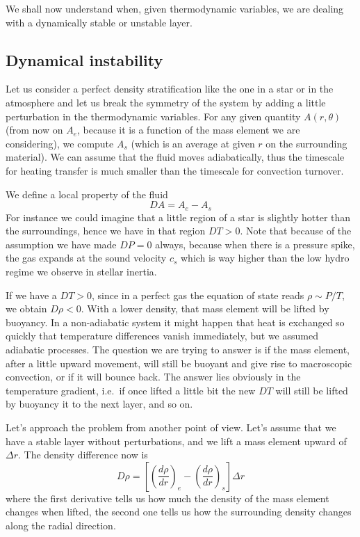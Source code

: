 We shall now understand when, given thermodynamic variables, we are dealing with a dynamically stable or unstable layer.


\subsection{Dynamical instability}
Let us consider a perfect density stratification like the one in a star or in the atmosphere and let us break the symmetry of the system by adding a little perturbation in the thermodynamic variables. For any given quantity $A(r, \theta)$ (from now on $A_e$, because it is a function of the mass element we are considering), we compute $A_s$ (which is an average at given $r$ on the surrounding material). We can assume that the fluid moves adiabatically, thus the timescale for heating transfer is much smaller than the timescale for convection turnover. 

We define a local property of the fluid 
$$
DA=A_e - A_s
$$
For instance we could imagine that a little region of a star is slightly hotter than the surroundings, hence we have in that region $DT > 0$. Note that because of the assumption we have made $DP=0$ always, because when there is a pressure spike, the gas expands at the sound velocity $c_s$ which is way higher than the low hydro regime we observe in stellar inertia.

If we have a $DT>0$, since in a perfect gas the equation of state reads $\rho \sim P/T$, we obtain $D \rho < 0$. With a lower density, that mass element will be lifted by buoyancy. In a non-adiabatic system it might happen that heat is exchanged so quickly that temperature differences vanish immediately, but we assumed adiabatic processes. The question we are trying to answer is if the mass element, after a little upward movement, will still be buoyant and give rise to macroscopic convection, or if it will bounce back. The answer lies obviously in the temperature gradient, i.e.\ if once lifted a little bit the new $DT$ will still be lifted by buoyancy it to the next layer, and so on. 

Let's approach the problem from another point of view. Let's assume that we have a stable layer without perturbations, and we lift a mass element upward of $\Delta r$. The density difference now is
\begin{equation}\label{eq:displacement}
D \rho = \left [  \left( \frac{d \rho}{d r} \right)_e - \left( \frac{d \rho}{d r} \right)_s   \right ] \Delta r
\end{equation}
where the first derivative tells us how much the density of the mass element changes when lifted, the second one tells us how the surrounding density changes along the radial direction. 

